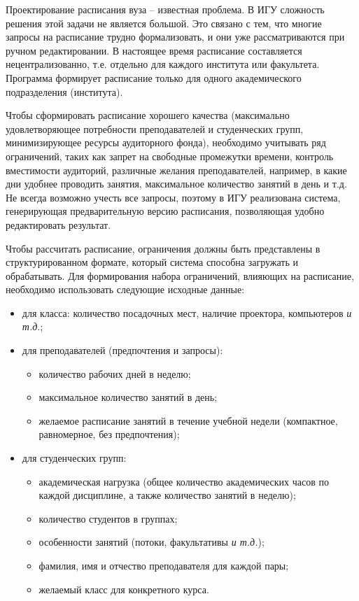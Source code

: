 \documentclass[
]{aiitart}
\begin{document}
Проектирование расписания вуза -- известная проблема. В ИГУ сложность решения этой задачи не является большой. Это связано с тем, что многие запросы на расписание трудно формализовать, и они уже рассматриваются при ручном редактировании. В настоящее время расписание составляется нецентрализованно, т.е. отдельно для каждого института или факультета.  Программа формирует расписание только для одного академического подразделения (института).

Чтобы сформировать расписание хорошего качества (максимально удовлетворяющее потребности преподавателей и студенческих групп, минимизирующее ресурсы аудиторного фонда), необходимо учитывать ряд ограничений, таких как запрет на свободные промежутки времени, контроль вместимости аудиторий, различные желания преподавателей, например, в какие дни удобнее проводить занятия, максимальное количество занятий в день и т.д. Не всегда возможно учесть все запросы, поэтому в ИГУ реализована система, генерирующая предварительную версию расписания, позволяющая удобно редактировать результат.

Чтобы рассчитать расписание, ограничения должны быть представлены в структурированном формате, который система способна загружать и обрабатывать. Для формирования набора ограничений, влияющих на расписание, необходимо использовать следующие исходные данные:
\begin{itemize}
\item для класса: количество посадочных мест, наличие проектора, компьютеров \emph{и т.д}.;
\item для преподавателей (предпочтения и запросы):
\begin{itemize}
\item количество рабочих дней в неделю;
\item максимальное количество занятий в день;
\item желаемое расписание занятий в течение учебной недели (компактное, равномерное, без предпочтения);
\end{itemize}
\item для студенческих групп:
\begin{itemize}
\item академическая нагрузка (общее количество академических часов по каждой дисциплине, а также количество занятий в неделю);
\item количество студентов в группах;
\item особенности занятий (потоки, факультативы \emph{и т.д.});
\item фамилия, имя и отчество преподавателя для каждой пары;
\item желаемый класс для конкретного курса.
\end{itemize}
\end{itemize}
\end{document}

